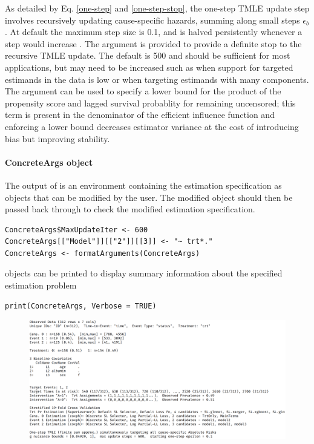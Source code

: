 \documentclass{report}
\newcommand{\1}{\ensuremath{\mathbf{1}}}
\begin{document}
As detailed by Eq. \eqref{one-step} and \eqref{one-step-stop}, the one-step TMLE update step involves recursively updating cause-specific hazards, summing along small steps \(\epsilon_b\). At default the maximum step size is 0.1, and is halved persistently whenever a step would increase . 
The  argument is provided to provide a definite stop to the recursive TMLE update. The default is 500 and should be sufficient for most applications, but may need to be increased such as when support for targeted estimands in the data is low or when targeting estimands with many components.
The argument  can be used to specify a lower bound for the product of the propensity score and lagged survival probablity for remaining uncensored; this term is present in the denominator of the efficient influence function and enforcing a lower bound decreases estimator variance at the cost of introducing bias but improving stability.

\paragraph{ConcreteArgs object}
\label{concreteargs}
The  output of  is an environment containing the estimation specification as objects that can be modified by the user. The modified  object should then be passed back through  to check the modified estimation specification.

\begin{lstlisting}
ConcreteArgs$MaxUpdateIter <- 600
ConcreteArgs[["Model"]][["2"]][[3]] <- "~ trt*."
ConcreteArgs <- formatArguments(ConcreteArgs)
\end{lstlisting}

 objects can be printed to display summary information about the specified estimation problem

\begin{lstlisting}
print(ConcreteArgs, Verbose = TRUE)
\end{lstlisting}

\begin{figure}[H]
\includegraphics[width=\linewidth]{fig/ConcreteArgs.png}
\end{figure}
\end{document}
